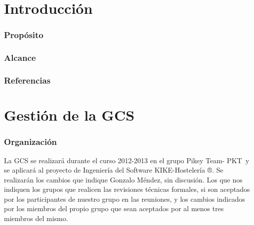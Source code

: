 \documentclass[spanish,a4paper,11pt, twoside]{report}	%
\newcommand*{\PKT}{\hbox{P}\kern-2.5pt\lower3.5pt\hbox{\small{K}}\kern-2.8pt\hbox{T}\kern-2pt}	%
\begin{document}
\newpage
\mbox{}
\thispagestyle{empty}						%
\newpage


\tableofcontents 							%

\newpage
\mbox{}
\thispagestyle{empty}						%
\newpage


\part{Introducción}
	\section{Propósito}
	\section{Alcance}
	\section{Referencias}

\newpage
\mbox{}
\thispagestyle{empty}						%
\newpage

\setcounter{section}{0}

\part{Gestión de la GCS }
	\section{Organización}
	La GCS se realizará durante el curso 2012-2013 en el grupo Pikey Team- \PKT \  y se aplicará al proyecto de Ingeniería del Software KIKE-Hostelería ®. Se realizarán  los cambios que indique Gonzalo Méndez, sin discusión. Los que nos indiquen
	los grupos que realicen las revisiones técnicas formales, si son aceptados por los participantes de nuestro grupo en las reuniones, y los cambios indicados por los miembros del propio grupo que sean aceptados por al menos tres miembros del mismo.
\end{document}
